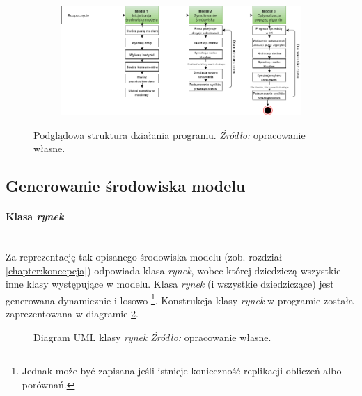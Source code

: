 \documentclass[polish, twoside, 12pt, a4paper]{article}
\theoremstyle{definition}
\theoremstyle{plain}
\theoremstyle{remark}
\begin{document}
\begin{figure}[hbt]
  \centering
  \begin{subfigure}[t]{0.95\textwidth}
    \includegraphics[width=\textwidth]{pictures/Struktura.png}
  \end{subfigure}
  \captionsetup{margin=10pt,font=small,labelfont=bf,width=.8\textwidth}
  \caption[Struktura działania programu]{Podglądowa struktura działania programu. \textit{Źródło:} opracowanie własne.}\label{fig:struktura}
\end{figure}


\subsection{Generowanie środowiska modelu}
\paragraph{Klasa \textit{rynek}}\mbox{}\\
Za reprezentację tak opisanego środowiska modelu (zob. rozdział \ref{chapter:koncepcja}) odpowiada klasa \textit{rynek}, wobec której dziedziczą wszystkie inne klasy występujące w modelu. Klasa \textit{rynek} (i wszystkie dziedziczące) jest generowana dynamicznie i losowo \footnote{Jednak może być zapisana jeśli istnieje konieczność replikacji obliczeń albo porównań.}.  Konstrukcja klasy \textit{rynek} w programie została zaprezentowana w diagramie \ref{UML:rynek}. \\


\begin{figure}[hbt]
  \centering
{}
  \captionsetup{margin=10pt,font=small,labelfont=bf,width=.8\textwidth}
  \caption[Diagram UML klasy rynek]{Diagram UML klasy \textit{rynek} \textit{Źródło:} opracowanie własne.} \label{UML:rynek}
\end{figure}
\end{document}
